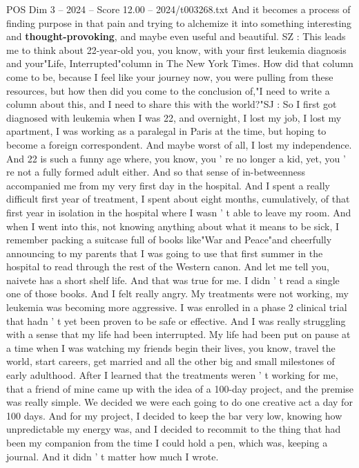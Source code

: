 \begin{textsample}{POS Dim 3 – 2024 – Score 12.00 – 2024/t003268.txt}
And it becomes a process of finding purpose in that pain and trying to alchemize it into something interesting and \textbf{thought-provoking}, and maybe even useful and beautiful.
SZ : This leads me to think about 22-year-old you, you know, with your first leukemia diagnosis and your"Life, Interrupted"column in The New York Times.
How did that column come to be, because I feel like your journey now, you were pulling from these resources, but how then did you come to the conclusion of,"I need to write a column about this, and I need to share this with the world?"SJ : So I first got diagnosed with leukemia when I was 22, and overnight, I lost my job, I lost my apartment, I was working as a paralegal in Paris at the time, but hoping to become a foreign correspondent.
And maybe worst of all, I lost my independence.
And 22 is such a funny age where, you know, you ' re no longer a kid, yet, you ' re not a fully formed adult either.
And so that sense of in-betweenness accompanied me from my very first day in the hospital.
And I spent a really difficult first year of treatment, I spent about eight months, cumulatively, of that first year in isolation in the hospital where I wasn ' t able to leave my room.
And when I went into this, not knowing anything about what it means to be sick, I remember packing a suitcase full of books like"War and Peace"and cheerfully announcing to my parents that I was going to use that first summer in the hospital to read through the rest of the Western canon.
And let me tell you, naivete has a short shelf life.
And that was true for me.
I didn ' t read a single one of those books.
And I felt really angry.
My treatments were not working, my leukemia was becoming more aggressive.
I was enrolled in a phase 2 clinical trial that hadn ' t yet been proven to be safe or effective.
And I was really struggling with a sense that my life had been interrupted.
My life had been put on pause at a time when I was watching my friends begin their lives, you know, travel the world, start careers, get married and all the other big and small milestones of early adulthood.
After I learned that the treatments weren ' t working for me, that a friend of mine came up with the idea of a 100-day project, and the premise was really simple.
We decided we were each going to do one creative act a day for 100 days.
And for my project, I decided to keep the bar very low, knowing how unpredictable my energy was, and I decided to recommit to the thing that had been my companion from the time I could hold a pen, which was, keeping a journal.
And it didn ' t matter how much I wrote.

\end{textsample}
